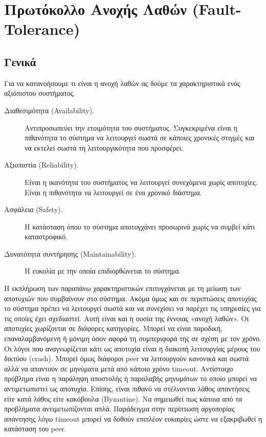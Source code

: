 \section{Πρωτόκολλο Ανοχής Λαθών (Fault-Tolerance)}
\label{sec:Fault}

\subsection{Γενικά}

Για να κατανοήσουμε τι είναι η ανοχή λαθών ας δούμε τα χαρακτηριστικά 
ενός αξιόπιστου συστήματος. 

\begin{description}
\item [Διαθεσιμότητα (Availability).] Αντιπροσωπεύει την ετοιμότητα του 
συστήματος. Συγκεκριμένα είναι η πιθανότητα το σύστημα να λειτουργεί 
σωστά σε κάποιες χρονικές στιγμές και να εκτελεί σωστά τη 
λειτουργικότητα που προσφέρει.
\item [Αξιοπιστία (Reliability).] Είναι η ικανότητα του συστήματος να 
λειτουργεί συνεχόμενα χωρίς αποτυχίες. Είναι η πιθανότητα να λειτουργεί 
σε ένα χρονικό διάστημα.
\item [Ασφάλεια (Safety).] Η κατάσταση όπου το σύστημα αποτυγχάνει 
προσωρινά χωρίς να συμβεί κάτι καταστροφικό.
\item [Δυνατότητα συντήρησης (Maintainability).] Η ευκολία με την οποία 
επιδιορθώνεται το σύστημα.
\end{description}

Η εκπλήρωση των παραπάνω χαρακτηριστικών επιτυγχάνεται με τη μείωση των 
αποτυχιών που συμβαίνουν στο σύστημα. Ακόμα όμως και σε περιπτώσεις 
αποτυχίας το σύστημα πρέπει να λειτουργεί σωστά και να συνεχίσει να 
παρέχει τις υπηρεσίες για τις οποίες έχει σχεδιαστεί. Αυτή είναι και η ουσία 
της έννοιας «ανοχή λαθών». Οι αποτυχίες χωρίζονται σε διάφορες κατηγορίες. 
Μπορεί να είναι παροδική, επαναλαμβανόμενη ή μόνιμη όσον αφορά τη συμπεριφορά 
της σε σχέση με τον χρόνο. Οι λόγοι που αναγνωρίζεται κάτι ως αποτυχία είναι 
η διακοπή λειτουργίας μέρους του δικτύου (crash). Μπορεί όμως διάφοροι 
peer να λειτουργούν κανονικά και σωστά αλλά να απαντούν σε μηνύματα μετά 
από κάποιο χρόνο timeout. Αντίστοιχο πρόβλημα είναι η παράληψη αποστολής 
ή παραλαβής μηνυμάτων το οποίο μπορεί να αντιμετωπιστεί ως αποτυχία. 
Επίσης, είναι πιθανό να στέλνονται λάθος απαντήσεις είτε κατά λάθος είτε 
κακόβουλα (Byzantine). Να σημειωθεί πως κάποια από τα προβλήματα 
αντιμετωπίζονται απλά. Παράδειγμα στην περίπτωση αργοπορίας απάντησης 
λόγω timeout μπορεί να δοθούν επιπλέον ευκαιρίες ώστε να εξακριβωθεί η 
κατάσταση του peer.

